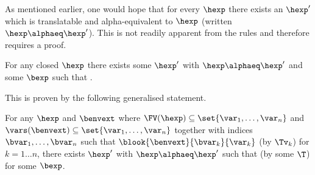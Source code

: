 As mentioned earlier, one would hope that for every $\hexp$ there exists an $\hexp'$ which is translatable and alpha-equivalent to $\hexp$ (written $\hexp \alphaeq \hexp'$).
This is not readily apparent from the rules and therefore requires a proof.

\begin{theorem}[Totality]
For any closed $\hexp$ there exists some $\hexp'$ with $\hexp \alphaeq \hexp'$ and some $\bexp$ such that .
\end{theorem}

This is proven by the following generalised statement.

\begin{lemma}
For any $\hexp$ and $\benvext$ where $\FV(\hexp) \subseteq \set{\var_1, \ldots, \var_n}$ and $\vars(\benvext) \subseteq \set{\var_1, \ldots, \var_n}$ together with indices $\bvar_1, \ldots, \bvar_n$ such that $\blook{\benvext}{\bvar_k}{\var_k}$ (by $\Tv_k$) for $k = 1 \ldots n$, there exists $\hexp'$ with $\hexp \alphaeq \hexp'$ such that  (by some $\T$) for some $\bexp$.
\end{lemma}

